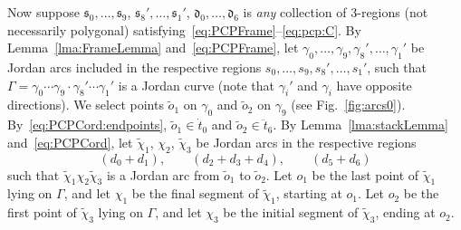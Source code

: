 \documentclass{article}
\newcommand{\tseq}[1]{\mathfrak{#1}}
\newcommand{\intermediate}[1]{\dot{#1}}
\newcommand{\inner}[1]{\ddot{#1}}
\begin{document}
Now suppose $\tseq{s}_0, \dots, \tseq{s}_9$, $\tseq{s}_8', \dots,
\tseq{s}_1'$, $\tseq{d}_0,\dots, \tseq{d}_6$ is {\em any} collection
of 3-regions (not necessarily polygonal)
satisfying~\eqref{eq:PCPFrame}--\eqref{eq:pcp:C}.  By
Lemma~\ref{lma:FrameLemma} and~\eqref{eq:PCPFrame}, let $\gamma_0,
\dots, \gamma_9,\gamma_8',\dots,\gamma_1'$ be Jordan arcs included in
the respective regions $s_0, \dots, s_9,s_8',\dots,s_1'$, such that
$\Gamma = \gamma_0 \cdots \gamma_9 \cdot \gamma_8' \cdots \gamma_1'$
is a Jordan curve (note that $\gamma_i'$ and $\gamma_i$ have opposite
directions). We select points $\tilde{o}_{1}$ on $\gamma_0$ and
$\tilde{o}_2$ on $\gamma_9$ (see Fig.~\ref{fig:arcs0}).
By~\eqref{eq:PCPCord:endpoints}, $\tilde{o}_1 \in \intermediate{t}_0$
and $\tilde{o}_2 \in \inner{t}_6$. By Lemma~\ref{lma:stackLemma}
and~\eqref{eq:PCPCord}, let $\tilde{\chi}_1$, $\chi_2$, $\tilde{\chi}_3$
be Jordan arcs in the respective regions
\begin{equation*}
(d_0 + d_1),\qquad (d_2 + d_3 + d_4),\qquad (d_5+ d_6)
\end{equation*}
such that $\tilde{\chi}_1 \chi_2 \tilde{\chi}_3$ is a Jordan arc from
$\tilde{o}_1$ to $\tilde{o}_2$. Let $o_{1}$ be the last point of
$\tilde{\chi}_1$ lying on $\Gamma$, and let $\chi_1$ be the final
segment of $\tilde{\chi}_1$, starting at $o_1$.  Let $o_2$ be the
first point of $\tilde{\chi}_3$ lying on $\Gamma$, and let $\chi_3$ be
the initial segment of $\tilde{\chi}_3$, ending at $o_2$.
\end{document}
